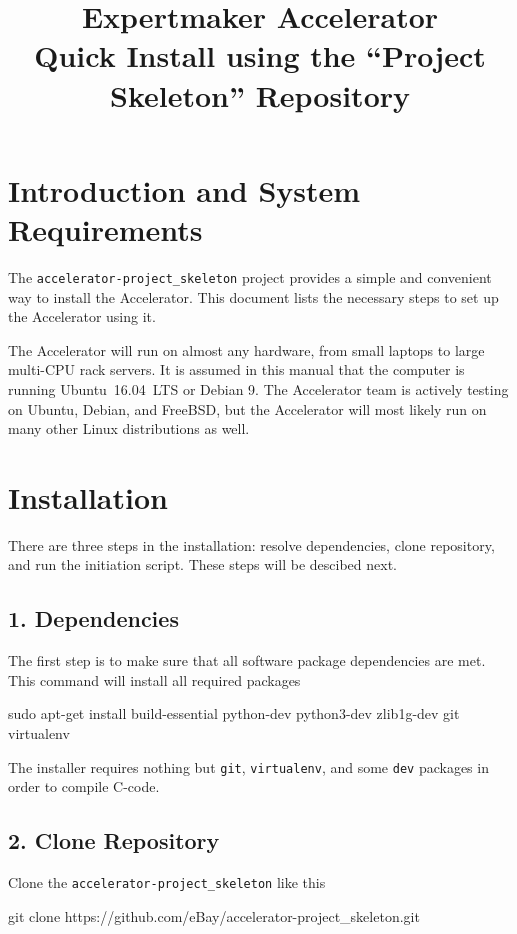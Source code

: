 \documentclass[a4paper]{article}
\title{\vspace{-20mm}Expertmaker Accelerator\\[1ex]\Large{Quick Install using the ``Project Skeleton'' Repository}}
\date{}
\begin{document}
\maketitle

\section*{Introduction and System Requirements}
The \texttt{accelerator-project\_skeleton} project provides a simple
and convenient way to install the Accelerator.  This document lists
the necessary steps to set up the Accelerator using it.

The Accelerator will run on almost any hardware, from small laptops to
large multi-CPU rack servers.  It is assumed in this manual that the
computer is running Ubuntu~16.04~LTS or Debian 9.  The Accelerator
team is actively testing on Ubuntu, Debian, and FreeBSD, but the
Accelerator will most likely run on many other Linux distributions as well.


\section*{Installation}
There are three steps in the installation: resolve dependencies, clone
repository, and run the initiation script.  These steps will be
descibed next.
\subsection*{1. Dependencies}
The first step is to make sure that all software package dependencies
are met.  This command will install all required packages
\begin{shell}
sudo apt-get install build-essential python-dev python3-dev zlib1g-dev git virtualenv
\end{shell}
The installer requires nothing but \texttt{git}, \texttt{virtualenv},
and some \texttt{dev} packages in order to compile C-code.

\subsection*{2. Clone Repository}
Clone the \texttt{accelerator-project\_skeleton} like this
\begin{shell}
git clone https://github.com/eBay/accelerator-project_skeleton.git
\end{shell}
\end{document}
